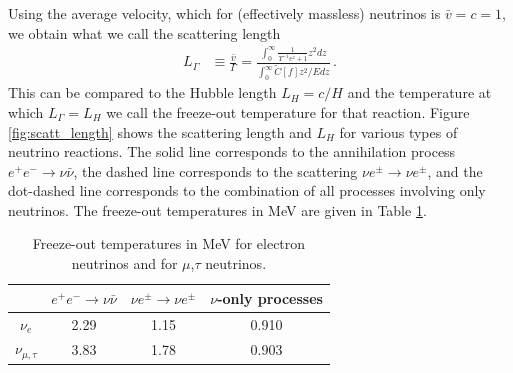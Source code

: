 Using the average velocity, which for (effectively massless) neutrinos is $\bar v=c=1$, we obtain what we call the scattering length
\begin{align}
L_\Gamma&\equiv\frac{\bar v}{\Gamma}=\frac{\int_0^\infty\frac{1}{\Upsilon^{-1}e^z+1}z^2dz}{\int_0^\infty \tilde C[f] z^2/E dz}\,.
\end{align}
This can be compared to the Hubble length $L_H=c/H$ and the temperature at which $L_\Gamma=L_H$ we call the freeze-out temperature for that reaction.  Figure \ref{fig:scatt_length} shows the scattering length and $L_H$ for various types of neutrino reactions.  The solid line corresponds to the annihilation process $e^+e^-\rightarrow \nu\bar\nu$, the dashed line corresponds to the scattering $\nu e^\pm\rightarrow \nu e^\pm$, and the dot-dashed line corresponds to the combination of all processes involving only neutrinos.  The freeze-out temperatures in MeV are given in Table \ref{table:freeze-out_temp}.

\begin{table}[ht]
\centering 
\begin{tabular}{|c|c|c|c|}
\hline
              & $e^+e^-\rightarrow \nu\bar\nu$ & $\nu e^\pm\rightarrow \nu e^\pm$ & $\nu$-only processes\\
\hline
$\nu_e$ &2.29 & 1.15&0.910\\
\hline
$\nu_{\mu,\tau}$ &3.83 & 1.78& 0.903\\
\hline
\end{tabular}
\caption{Freeze-out temperatures in MeV for electron neutrinos and for $\mu$,$\tau$ neutrinos.}
\label{table:freeze-out_temp}
\end{table}

